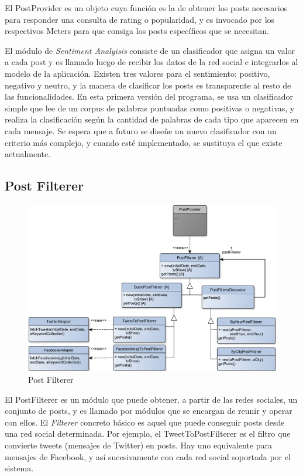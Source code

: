 El PostProvider es un objeto cuya función es la de obtener los posts necesarios para responder una consulta de rating o popularidad, y es invocado por los respectivos Meters para que consiga los posts específicos que se necesitan.
\bigskip

El módulo de \emph{Sentiment Analyisis} consiste de un clasificador que asigna un valor a cada post y es llamado luego de recibir los datos de la red social e integrarlos al modelo de la aplicación. Existen tres valores para el sentimiento: positivo, negativo y neutro, y la manera de clasificar los posts es transparente al resto de las funcionalidades. En esta primera versión del programa, se usa un clasificador simple que lee de un corpus de palabras puntuadas como positivas o negativas, y realiza la clasificación según la cantidad de palabras de cada tipo que aparecen en cada mensaje. Se espera que a futuro se diseñe un nuevo clasificador con un criterio más complejo, y cuando esté implementado, se sustituya el que existe actualmente.


\subsection{Post Filterer}

\begin{figure}[H]
\centering
\includegraphics[width=\textwidth]{graph/clase/filterer.pdf}
\caption{Post Filterer}
\end{figure}

El PostFilterer es un módulo que puede obtener, a partir de las redes sociales, un conjunto de posts, y es llamado por módulos que se encargan de reunir y operar con ellos. El \emph{Filterer} concreto básico es aquel que puede conseguir posts desde una red social determinada. Por ejemplo, el TweetToPostFilterer es el filtro que convierte tweets (mensajes de Twitter) en posts. Hay uno equivalente para mensajes de Facebook, y así sucesivamente con cada red social soportada por el sistema.

